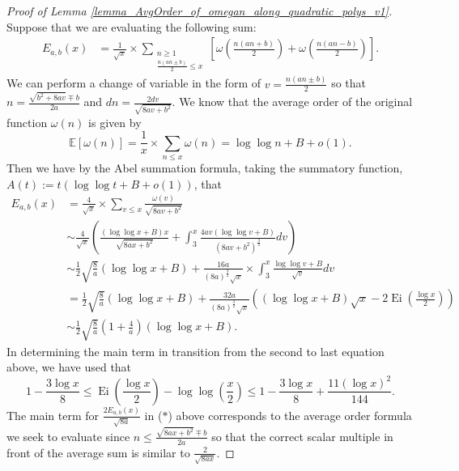 \documentclass[12pt,reqno,a4letter]{article}
\numberwithin{figure}{section}
\numberwithin{table}{section}
\numberwithin{equation}{section}
\theoremstyle{plain}
\numberwithin{theorem}{section}
\theoremstyle{definition}
\begin{document}
\begin{proof}[Proof of Lemma \ref{lemma_AvgOrder_of_omegan_along_quadratic_polys_v1}]
Suppose that we are evaluating the following sum:
\begin{align*}
E_{a,b}(x) & = \frac{1}{\sqrt{x}} \times \sum_{\substack{n \geq 1 \\ \frac{n(an \pm b)}{2} \leq x}} 
     \left[\omega\left(\frac{n(an + b)}{2}\right) + \omega\left(\frac{n(an - b)}{2}\right)\right]. 
\end{align*}
We can perform a change of variable in the form of $v = \frac{n(an \pm b)}{2}$ so that 
$n = \frac{\sqrt{b^2+8av} \mp b}{2a}$ and $dn = \frac{2dv}{\sqrt{8av+b^2}}$. 
We know that the average order of the original function $\omega(n)$ is given by \cite[\S 22.10]{HARDYWRIGHT} 
$$\mathbb{E}[\omega(n)] = \frac{1}{x} \times \sum_{n \leq x} \omega(n) = \log\log n + B + o(1).$$
Then we have by the Abel summation formula, taking the 
summatory function, $A(t) := t(\log\log t + B + o(1))$, that 
\begin{align*}
E_{a,b}(x) & = \frac{4}{\sqrt{x}} \times \sum_{v \leq x} \frac{\omega(v)}{\sqrt{8av+b^2}} \\ 
     & \sim \frac{4}{\sqrt{x}} \left( \frac{(\log\log x + B) x}{\sqrt{8ax+b^2}} + 
     \int_3^x \frac{4av (\log\log v + B)}{(8av+b^2)^{\frac{3}{2}}} dv\right) \\ 
     & \sim \frac{1}{2} \sqrt{\frac{8}{a}} (\log\log x + B) + \frac{16a}{(8a)^{\frac{3}{2}} \sqrt{x}} \times 
     \int_3^x \frac{\log\log v + B}{\sqrt{v}} dv \\ 
     & = \frac{1}{2} \sqrt{\frac{8}{a}} (\log\log x + B) + 
     \frac{32a}{(8a)^{\frac{3}{2}} \sqrt{x}} \left((\log\log x + B) \sqrt{x} - 
     2 \operatorname{Ei}\left(\frac{\log x}{2}\right)\right) \\ 
\tag{$\ast$} 
     & \sim \frac{1}{2} \sqrt{\frac{8}{a}}\left(1 + \frac{4}{a}\right) \left(\log\log x + B\right). 
\end{align*}
In determining the main term in transition from the second to last equation above, we have used that 
\[
1 - \frac{3\log x}{8} \leq 
     \operatorname{Ei}\left(\frac{\log x}{2}\right) - \log\log\left(\frac{x}{2}\right) \leq 
     1 - \frac{3\log x}{8} + \frac{11 (\log x)^2}{144}. 
\]
The main term for $\frac{2E_{a,b}(x)}{\sqrt{8a}}$ in ($\ast$) above 
corresponds to the average order formula we seek to evaluate since  
$n \leq \frac{\sqrt{8ax+b^2} \mp b}{2a}$ so that the correct scalar multiple in front of the average sum is 
similar to $\frac{2}{\sqrt{8ax}}$. 
\end{proof}
\end{document}
